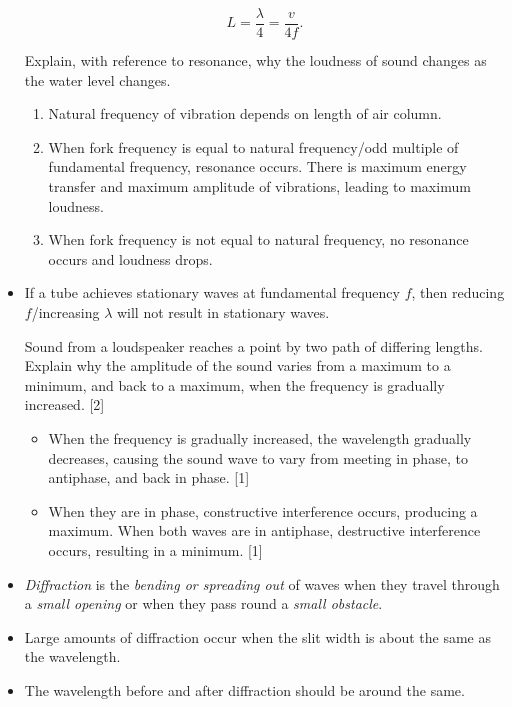 \documentclass[oneside]{book}
\begin{document}
\begin{itemize}
    \[L=\frac{\lambda}{4}=\frac{v}{4f}.\]
    \begin{example}{}{}
        Explain, with reference to resonance, why the loudness of sound changes as the water level changes.
        \begin{enumerate}
            \item Natural frequency of vibration depends on length of air column.
            \item When fork frequency is equal to natural frequency/odd multiple of fundamental frequency, resonance occurs. There is maximum energy transfer and maximum amplitude of vibrations, leading to maximum loudness.
            \item When fork frequency is not equal to natural frequency, no resonance occurs and loudness drops.
        \end{enumerate}
    \end{example}
    \item If a tube achieves stationary waves at fundamental frequency \(f\), then reducing \(f\)/increasing \(\lambda\) will not result in stationary waves.
    \begin{example}{}{}
        Sound from a loudspeaker reaches a point by two path of differing lengths. Explain why the amplitude of the sound varies from a maximum to a minimum, and back to a maximum, when the frequency is gradually increased. \hspace*{\fill} [2]
        \begin{itemize}
            \item When the frequency is gradually increased, the wavelength gradually decreases, causing the sound wave to vary from meeting in phase, to antiphase, and back in phase. \hspace*{\fill} [1]
            \item When they are in phase, constructive interference occurs, producing a maximum. When both waves are in antiphase, destructive interference occurs, resulting in a minimum. \hspace*{\fill} [1]
        \end{itemize}
    \end{example}
    \item \emph{Diffraction} is the \emph{bending or spreading out} of waves when they travel through a \emph{small opening} or when they pass round a \emph{small obstacle}.
    \item Large amounts of diffraction occur when the slit width is about the same as the wavelength.
    \item The wavelength before and after diffraction should be around the same.

\end{itemize}
\end{document}

